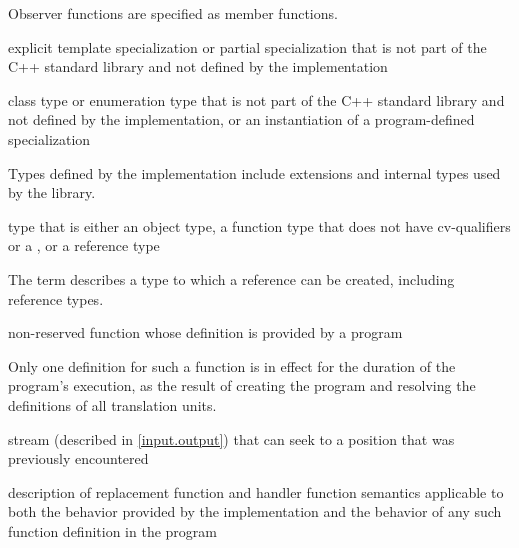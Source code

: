\begin{defnote}
Observer functions are specified as
member functions.
\end{defnote}

%
explicit template specialization or partial specialization
that is not part of the C++ standard library and
not defined by the implementation

%
class type or enumeration type
that is not part of the C++ standard library and
not defined by the implementation,
or an instantiation of a program-defined specialization

\begin{defnote}
Types defined by the implementation include
extensions and internal types used by the library.
\end{defnote}

%
type that is either an
object type, a function type that does not have cv-qualifiers or a
, or a reference type

\begin{defnote}
The term describes a type to which a reference can be created,
including reference types.
\end{defnote}

%
non-reserved function
whose definition is provided by a \Cpp{} program

\begin{defnote}
Only one definition for such a function is in effect for the duration of the program's
execution, as the result of creating the program and resolving the
definitions of all translation units.
\end{defnote}

%
stream (described in \ref{input.output}) that can seek to a position that was
previously encountered

%
description of replacement function and handler function semantics
applicable to both the behavior provided by the implementation and
the behavior of any such function definition in the program

